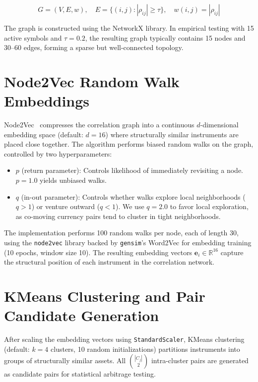 \documentclass[letterpaper,11pt]{report}
\begin{document}
$$G = (V, E, w), \quad E = \{(i, j) : |\rho_{ij}| \geq \tau\}, \quad w(i,j) = |\rho_{ij}|$$

The graph is constructed using the NetworkX library. In empirical testing with 15 active symbols and $\tau = 0.2$, the resulting graph typically contains 15 nodes and 30--60 edges, forming a sparse but well-connected topology.

\section{Node2Vec Random Walk Embeddings}

Node2Vec~\cite{mlArb} compresses the correlation graph into a continuous $d$-dimensional embedding space (default: $d = 16$) where structurally similar instruments are placed close together. The algorithm performs biased random walks on the graph, controlled by two hyperparameters:

\begin{itemize}
    \item $p$ (return parameter): Controls likelihood of immediately revisiting a node. $p = 1.0$ yields unbiased walks.
    \item $q$ (in-out parameter): Controls whether walks explore local neighborhoods ($q > 1$) or venture outward ($q < 1$). We use $q = 2.0$ to favor local exploration, as co-moving currency pairs tend to cluster in tight neighborhoods.
\end{itemize}

The implementation performs 100 random walks per node, each of length 30, using the \texttt{node2vec} library backed by \texttt{gensim}'s Word2Vec for embedding training (10 epochs, window size 10). The resulting embedding vectors $\mathbf{e}_i \in \mathbb{R}^{16}$ capture the structural position of each instrument in the correlation network.

\section{KMeans Clustering and Pair Candidate Generation}

After scaling the embedding vectors using \texttt{StandardScaler}, KMeans clustering (default: $k = 4$ clusters, 10 random initializations) partitions instruments into groups of structurally similar assets. All ${|C_j| \choose 2}$ intra-cluster pairs are generated as candidate pairs for statistical arbitrage testing.
\end{document}
